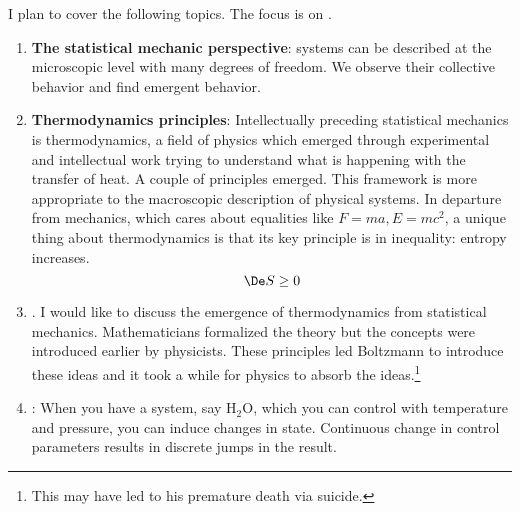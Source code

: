 I plan to cover the following topics. The focus is on .
\begin{enumerate}
\item
\textbf{The statistical mechanic perspective}: systems can be described at the microscopic level with many degrees of freedom. We observe their collective behavior and find emergent behavior.
\item
\textbf{Thermodynamics principles}:
Intellectually preceding statistical mechanics is thermodynamics, a field of physics which emerged through experimental and intellectual work trying to understand what is happening with the transfer of heat. A couple of principles emerged. This framework is more appropriate to the macroscopic description of physical systems.
In departure from mechanics, which cares about equalities like $F=ma, E=mc^2$, a unique thing about thermodynamics is that its key principle is in inequality: entropy increases.
\[
\De S\ge 0
\]
\item
{}. %
I would like to discuss the emergence of thermodynamics from statistical mechanics. Mathematicians formalized the theory but the concepts were introduced earlier by physicists. These principles led Boltzmann to introduce these ideas and it took a while for physics to absorb the ideas.\footnote{This may have led to his premature death via suicide.}
\item 
{}: %
When you have a system, say $\text{H}_2\text{O}$, which you can control with temperature and pressure, you can induce changes in state. Continuous change in control parameters results in discrete jumps in the result. 


\end{enumerate}
